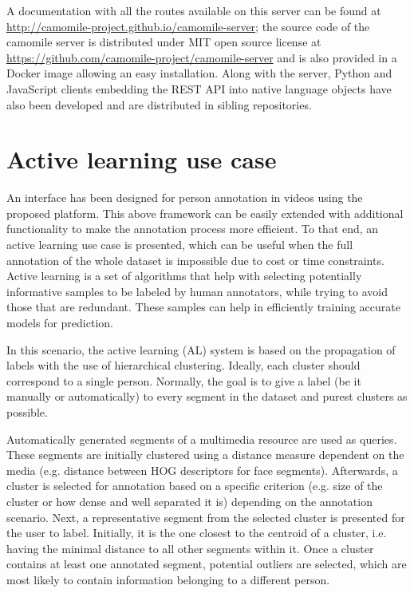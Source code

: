 \documentclass[10pt, a4paper]{article}
\begin{document}
A documentation with all the routes available on this server can be found at 
\url{http://camomile-project.github.io/camomile-server}; the source code of the camomile server is distributed under MIT open source license at
\url{https://github.com/camomile-project/camomile-server} and is also provided in a Docker image allowing an easy installation.
Along with the server, Python and JavaScript clients embedding the REST API into native language objects have also been developed and are distributed in sibling repositories.


\section{Active learning use case}

An interface has been designed for person annotation in videos using the proposed platform. This above framework can be easily extended with additional functionality to make the annotation process more efficient. To that end, an active learning use case is presented, which can be useful when the full annotation of the whole dataset is impossible due to cost or time constraints. Active learning is a set of algorithms that help with selecting  potentially informative samples to be labeled by human annotators, while trying to avoid those that are redundant. These samples can help in efficiently training accurate models for prediction.

In this scenario, the active learning (AL) system is based on the propagation of labels with the use of hierarchical clustering. Ideally, each cluster should correspond to a single person. Normally, the goal is to give a label (be it manually or automatically) to every segment in the dataset and purest clusters as possible.

Automatically generated segments of a multimedia resource are used as queries. These segments are initially clustered using a distance measure dependent on the media (e.g. distance between HOG descriptors for face segments).  Afterwards, a cluster is selected for annotation based on a specific criterion (e.g. size of the cluster or how dense and well separated it is) depending on the annotation scenario. Next, a representative segment from the selected cluster is presented for the user to label. Initially, it is the one closest to the centroid of a cluster, i.e. having the minimal distance to all other segments within it. Once a cluster contains at least one annotated segment, potential outliers are selected, which are most likely to contain information belonging to a different person.
\end{document}
